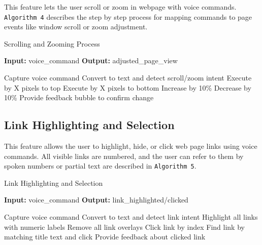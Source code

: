 This feature lets the user scroll or zoom in webpage with voice commands. \texttt{Algorithm 4} describes the step by step process for mapping commands to page events like window scroll or zoom adjustment.

\begin{algorithm}[H]
    \caption{Scrolling and Zooming Process}
    \label{alg:scroll_zoom}
    \textbf{Input:} voice\_command  
    \textbf{Output:} adjusted_page_view  
    \begin{algorithmic}[1]
        \State Capture voice command
        \State Convert to text and detect scroll/zoom intent
            \State Execute  by X pixels to top
            \State Execute  by X pixels to bottom
            \State Increase  by 10\% 
            \State Decrease  by 10\% 
        \EndIf
        \State Provide feedback bubble to confirm change
    \end{algorithmic}
\end{algorithm}

\subsection{Link Highlighting and Selection}

This feature allows the user to highlight, hide, or click web page links using voice commands. All visible links are numbered, and the user can refer to them by spoken numbers or partial text are described in \texttt{Algorithm 5}.

\begin{algorithm}[H]
    \caption{Link Highlighting and Selection}
    \label{alg:link_interaction}
    \textbf{Input:} voice\_command  
    \textbf{Output:} link\_highlighted/clicked  
    \begin{algorithmic}[1]
        \State Capture voice command
        \State Convert to text and detect link intent
            \State Highlight all links with numeric labels
            \State Remove all link overlays
                \State Click link by index 
            \Else 
                \State Find link by matching title text and click 
            \EndIf
        \EndIf
        \State Provide feedback about clicked link
    \end{algorithmic}
\end{algorithm}

